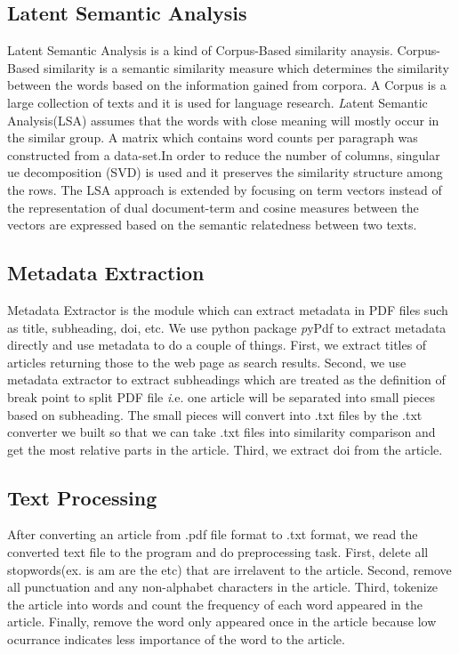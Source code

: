 \subsection{Latent Semantic Analysis}
Latent Semantic Analysis is a kind of Corpus-Based similarity anaysis. Corpus-Based similarity is a semantic similarity measure which determines the similarity between the words based on the information gained from corpora. A Corpus is a large collection of texts and it is used for language research. \textit Latent Semantic Analysis(LSA) assumes that the words with close meaning will mostly occur in the similar group. A matrix which contains word counts per paragraph was constructed from a  data-set.In order to reduce the number of columns, singular ue decomposition (SVD) is used and it preserves the similarity structure among the rows. The LSA approach is extended by focusing on term vectors instead of the representation of dual document-term and cosine measures between the vectors are expressed based on the semantic relatedness between two texts.
 
\subsection{Metadata Extraction}
Metadata Extractor is the module which can extract metadata in PDF files such as title, subheading, doi, etc. We use python package \textit pyPdf to extract metadata directly and use metadata to do a couple of things. First, we extract titles of articles returning those to the web page as search results. Second, we use metadata extractor to extract subheadings which are treated as the definition of break point to split PDF file \textit i.e. one article will be separated into small pieces based on subheading. The small pieces will convert into .txt files by the .txt converter we built so that we can take .txt files into similarity comparison and get the most relative parts in the article. Third, we extract doi from the article. 

 \subsection{Text Processing}
 After converting an article from .pdf file format to .txt format, we read the converted text file to the program and do preprocessing task. First, delete all stopwords(ex. is am are the etc) that are irrelavent to the article. Second, remove all punctuation and any non-alphabet characters  in the article. Third, tokenize the article into words and count the frequency of each word appeared in the article. Finally, remove the word only appeared once in the article because low ocurrance indicates less importance of the word to the article.


